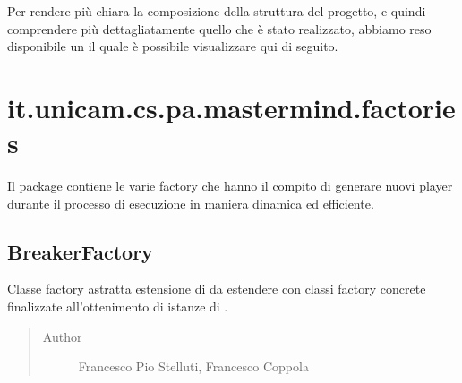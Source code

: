 \documentclass[letterpaper,10pt,italian]{sphinxmanual}
\begin{document}
Per rendere più chiara la composizione della struttura del progetto, e quindi comprendere più dettagliatamente quello
che è stato realizzato, abbiamo reso disponibile un  il quale è possibile visualizzare qui di seguito.

\noindent{}


\section{it.unicam.cs.pa.mastermind.factories}
\label{\detokenize{source/it/unicam/cs/pa/mastermind/factories/package-index:it-unicam-cs-pa-mastermind-factories}}\label{\detokenize{source/it/unicam/cs/pa/mastermind/factories/package-index::doc}}
Il package contiene le varie factory che hanno il compito di generare nuovi player durante il processo di esecuzione in maniera dinamica ed efficiente.

\label{\detokenize{source/it/unicam/cs/pa/mastermind/factories/package-index:package-it.unicam.cs.pa.mastermind.factories}}

\subsection{BreakerFactory}
\label{\detokenize{source/it/unicam/cs/pa/mastermind/factories/BreakerFactory:breakerfactory}}\label{\detokenize{source/it/unicam/cs/pa/mastermind/factories/BreakerFactory::doc}}

\begin{fulllineitems}
\label{\detokenize{source/it/unicam/cs/pa/mastermind/factories/BreakerFactory:it.unicam.cs.pa.mastermind.factories.BreakerFactory}}
Classe factory astratta estensione di  da estendere con classi factory concrete finalizzate all’ottenimento di istanze di .
\begin{quote}\begin{description}
\item[{Author}] \leavevmode
Francesco Pio Stelluti, Francesco Coppola

\end{description}\end{quote}

\end{fulllineitems}
\end{document}
